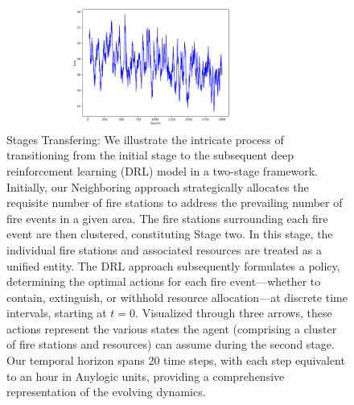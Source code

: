 \documentclass[lettersize,journal]{IEEEtran}
\begin{document}
  \begin{figure}
    \centering
    \includegraphics[height=4cm,width=9.5cm]{figs/manager_actor_loss.png}
    \caption{Stages Transfering: We illustrate the intricate process of transitioning from the initial stage to the subsequent deep reinforcement learning (DRL) model in a two-stage framework. Initially, our Neighboring approach strategically allocates the requisite number of fire stations to address the prevailing number of fire events in a given area. The fire stations surrounding each fire event are then clustered, constituting Stage two. In this stage, the individual fire stations and associated resources are treated as a unified entity. The DRL approach subsequently formulates a policy, determining the optimal actions for each fire event—whether to contain, extinguish, or withhold resource allocation—at discrete time intervals, starting at $t=0$. Visualized through three arrows, these actions represent the various states the agent (comprising a cluster of fire stations and resources) can assume during the second stage. Our temporal horizon spans 20 time steps, with each step equivalent to an hour in Anylogic units, providing a comprehensive representation of the evolving dynamics.}\end{figure}
  
  
\end{document}
